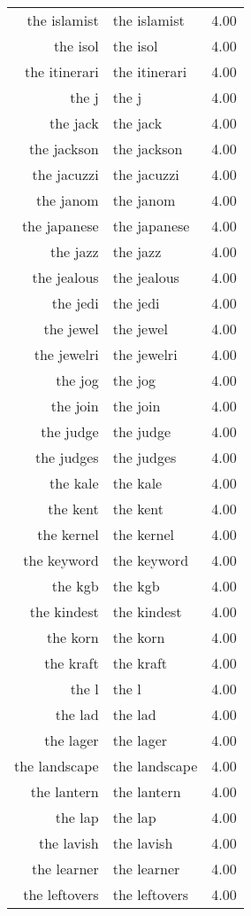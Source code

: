 \begin{table}[ht]
\begin{tabular}{rlr}
  the islamist & the islamist & 4.00 \\ 
  the isol & the isol & 4.00 \\ 
  the itinerari & the itinerari & 4.00 \\ 
  the j & the j & 4.00 \\ 
  the jack & the jack & 4.00 \\ 
  the jackson & the jackson & 4.00 \\ 
  the jacuzzi & the jacuzzi & 4.00 \\ 
  the janom & the janom & 4.00 \\ 
  the japanese & the japanese & 4.00 \\ 
  the jazz & the jazz & 4.00 \\ 
  the jealous & the jealous & 4.00 \\ 
  the jedi & the jedi & 4.00 \\ 
  the jewel & the jewel & 4.00 \\ 
  the jewelri & the jewelri & 4.00 \\ 
  the jog & the jog & 4.00 \\ 
  the join & the join & 4.00 \\ 
  the judge & the judge & 4.00 \\ 
  the judges & the judges & 4.00 \\ 
  the kale & the kale & 4.00 \\ 
  the kent & the kent & 4.00 \\ 
  the kernel & the kernel & 4.00 \\ 
  the keyword & the keyword & 4.00 \\ 
  the kgb & the kgb & 4.00 \\ 
  the kindest & the kindest & 4.00 \\ 
  the korn & the korn & 4.00 \\ 
  the kraft & the kraft & 4.00 \\ 
  the l & the l & 4.00 \\ 
  the lad & the lad & 4.00 \\ 
  the lager & the lager & 4.00 \\ 
  the landscape & the landscape & 4.00 \\ 
  the lantern & the lantern & 4.00 \\ 
  the lap & the lap & 4.00 \\ 
  the lavish & the lavish & 4.00 \\ 
  the learner & the learner & 4.00 \\ 
  the leftovers & the leftovers & 4.00 \\ 

\end{tabular}
\end{table}
